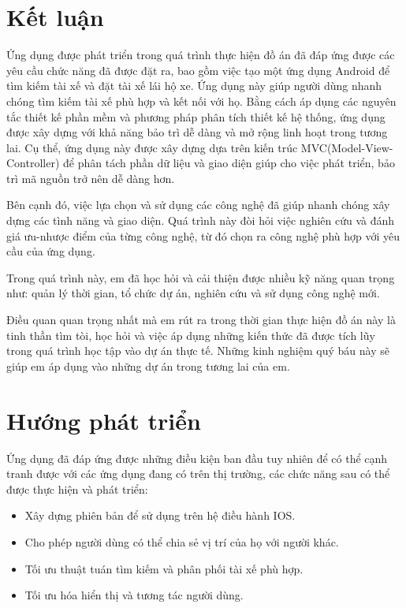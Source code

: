 \documentclass[../DoAn.tex]{subfiles}
\begin{document}
\section{Kết luận}
Ứng dụng được phát triển trong quá trình thực hiện đồ án đã đáp ứng được 
các yêu cầu chức năng đã được đặt ra, bao gồm việc tạo một ứng dụng Android 
để tìm kiếm tài xế và đặt tài xế lái hộ xe. Ứng dụng này giúp người dùng 
nhanh chóng tìm kiếm tài xế phù hợp và kết nối với họ.
Bằng cách áp dụng các nguyên tắc thiết kế phần mềm và phương pháp 
phân tích thiết kế hệ thống, ứng dụng được xây dựng với khả năng 
bảo trì dễ dàng và mở rộng linh hoạt trong tương lai. Cụ thể, ứng dụng này được xây 
dựng dựa trên kiến trúc MVC(Model-View-Controller) để phân tách phần dữ liệu và giao diện giúp cho việc 
phát triển, bảo trì mã nguồn trở nên dễ dàng hơn.

Bên cạnh đó, việc lựa chọn và sử dụng các công nghệ đã giúp nhanh chóng xây dựng các tình năng và giao diện. 
Quá trình này đòi hỏi việc nghiên cứu và đánh giá ưu-nhược điểm của từng công nghệ, từ đó chọn ra công nghệ phù hợp 
với yêu cầu của ứng dụng.

Trong quá trình này, em đã học hỏi và cải thiện được nhiều kỹ năng quan trọng như: quản lý thời gian, tổ chức dự án, nghiên cứu và sử dụng công nghệ mới.

Điều quan quan trọng nhất mà em rút ra trong thời gian thực hiện đồ án này là tinh thần tìm tòi, học hỏi và việc áp dụng những kiến thức đã được tích lũy trong quá trình học tập vào dự án thực tế.
Những kinh nghiệm quý báu này sẽ giúp em áp dụng vào những dự án trong tương lai của em.
\section{Hướng phát triển}
Ứng dụng đã đáp ứng được những điều kiện ban đầu tuy nhiên để có thể cạnh tranh 
được với các ứng dụng đang có trên thị trường, các chức năng sau có thể được thực hiện và phát triển:
\begin{itemize}
  \item Xây dựng phiên bản để sử dụng trên hệ điều hành IOS.
  \item Cho phép người dùng có thể chia sẻ vị trí của họ với người khác.
  \item Tối ưu thuật tuán tìm kiếm và phân phối tài xế phù hợp.
  \item Tối ưu hóa hiển thị và tương tác người dùng.
\end{itemize}
\end{document}

